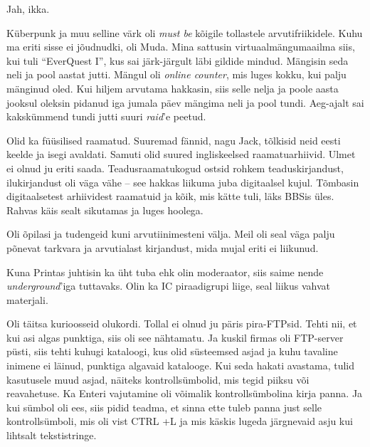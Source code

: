 
Jah, ikka.

Küberpunk ja muu selline värk oli \emph{must be} kõigile tollastele
arvutifriikidele. Kuhu ma eriti 
sisse ei jõudnudki, oli Muda. Mina sattusin virtuaalmängumaailma 
siis, kui tuli \enquote{EverQuest I}, kus sai 
järk-järgult läbi gildide mindud. Mängisin seda neli ja pool aastat jutti. 
Mängul oli \emph{online counter}, mis luges kokku, kui palju mänginud oled. Kui hiljem arvutama hakkasin, siis selle nelja ja poole aasta jooksul oleksin pidanud iga jumala 
päev mängima neli ja pool tundi. Aeg-ajalt sai 
kakskümmend tundi jutti suuri \emph{raid}'e peetud.


Olid ka füüsilised raamatud. Suuremad fännid, nagu Jack, tõlkisid neid eesti keelde ja isegi 
avaldati. Samuti olid suured ingliskeelsed raamatuarhiivid. Ulmet ei olnud ju eriti saada. Teadusraamatukogud ostsid rohkem 
teaduskirjandust, ilukirjandust oli väga vähe -- see hakkas liikuma 
juba digitaalsel kujul. Tõmbasin digitaalsetest arhiividest raamatuid ja kõik, mis kätte tuli, läks
BBSis üles. Rahvas käis sealt
sikutamas ja luges hoolega. 


Oli õpilasi ja tudengeid kuni arvutiinimesteni välja. Meil 
oli seal väga palju põnevat tarkvara ja arvutialast kirjandust, mida mujal eriti ei liikunud. 

Kuna Printas juhtisin ka üht tuba ehk olin moderaator, siis saime nende 
\emph{underground}'iga tuttavaks. Olin ka IC piraadigrupi liige, 
seal liikus vahvat materjali. 

Oli täitsa kurioosseid olukordi. Tollal 
ei olnud ju päris pira-FTPsid. Tehti nii, et kui asi algas 
punktiga, siis oli see nähtamatu. Ja kuskil firmas oli FTP-server püsti, 
siis tehti kuhugi kataloogi, kus olid süsteemsed asjad ja 
kuhu tavaline inimene ei läinud, punktiga algavaid katalooge. Kui seda 
hakati avastama, tulid kasutusele muud asjad, näiteks 
kontrollsümbolid, mis tegid piiksu või reavahetuse. 
Ka Enteri vajutamine oli võimalik 
kontrollsümbolina kirja panna. Ja kui sümbol oli ees, siis pidid 
teadma, et sinna ette tuleb panna just selle kontrollsümboli, mis oli vist CTRL +L ja mis 
käskis lugeda järgnevaid asju kui lihtsalt tekstistringe.

